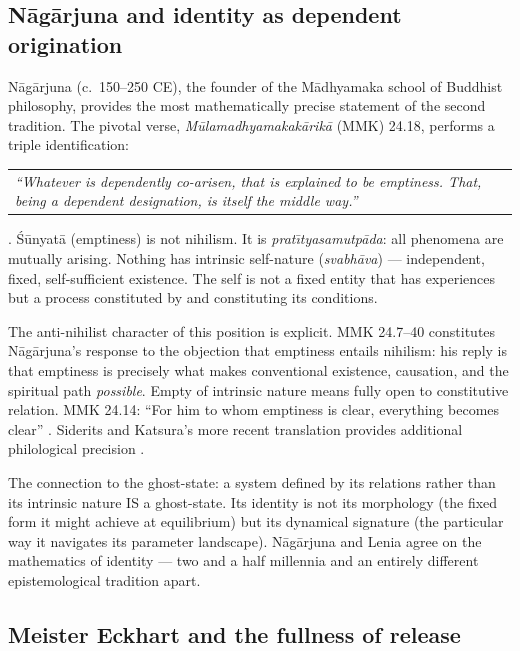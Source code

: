 \documentclass[12pt, a4paper]{article}
\begin{document}
\subsection{N\={a}g\={a}rjuna and identity as dependent origination}

N\={a}g\={a}rjuna (c.\ 150--250 CE), the founder of the M\={a}dhyamaka school of Buddhist
philosophy, provides the most mathematically precise statement of the second tradition. The
pivotal verse, \textit{M\={u}lamadhyamakak\={a}rik\={a}} (MMK) 24.18, performs a triple
identification:

\begin{center}
\begin{tabular}{p{}}
\textit{``Whatever is dependently co-arisen, that is explained to be emptiness.
That, being a dependent designation, is itself the middle way.''}
\end{tabular}
\end{center}

\citep{garfield1995}. \'{S}\={u}nyat\={a} (emptiness) is not nihilism. It is
\textit{prat\={\i}tyasamutp\={a}da}: all phenomena are mutually arising. Nothing has
intrinsic self-nature (\textit{svabh\={a}va}) --- independent, fixed, self-sufficient
existence. The self is not a fixed entity that has experiences but a process constituted by
and constituting its conditions.

The anti-nihilist character of this position is explicit. MMK 24.7--40 constitutes
N\={a}g\={a}rjuna's response to the objection that emptiness entails nihilism: his reply is
that emptiness is precisely what makes conventional existence, causation, and the spiritual
path \textit{possible}. Empty of intrinsic nature means fully open to constitutive
relation. MMK 24.14: ``For him to whom emptiness is clear, everything becomes clear''
\citep{garfield1995}. Siderits and Katsura's more recent translation provides additional
philological precision \citep{siderits2013}.

The connection to the ghost-state: a system defined by its relations rather than its
intrinsic nature IS a ghost-state. Its identity is not its morphology (the fixed form it
might achieve at equilibrium) but its dynamical signature (the particular way it navigates
its parameter landscape). N\={a}g\={a}rjuna and Lenia agree on the mathematics of identity
--- two and a half millennia and an entirely different epistemological tradition apart.

\subsection{Meister Eckhart and the fullness of release}
\end{document}

